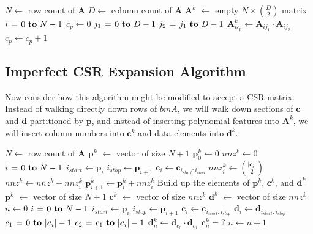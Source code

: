 \documentclass{article} %
\begin{document}
\begin{codebox}
\footnotesize
{}
    \li $N \gets$ row count of $\bm{A}$
    \li $D \gets$ column count of $\bm{A}$
    \li $\bm{A}^k$ $\gets$ empty $N \times \binom{D}{2}$ matrix
    \li \For $i \gets 0 \To N-1$ \Do
    \li     $c_p \gets 0$
    \li     \For $j_1 \gets 0 \To D-1$ \Do
    \li         \For $j_2 \gets j_1 \To D-1$ \Do
    \li             $\bm{A}^k_{i{c_p}} \gets \bm{A}_{ij_1} \cdot \bm{A}_{ij_2}$
    \li             $c_p \gets c_p + 1$
                \End
            \End
       	\End
\end{codebox}

\subsection{Imperfect CSR Expansion Algorithm}
\label{sec:final-algo}
Now consider how this algorithm might be modified to accept a CSR matrix.
Instead of walking directly down rows of $bm{A}$, we will walk down sections of $\bm{c}$ and $\bm{d}$ partitioned by $\bm{p}$, and instead of inserting polynomial features into $\bm{A}^k$, we will insert column numbers into $\bm{c}^k$ and data elements into $\bm{d}^k$.

\begin{codebox}
\footnotesize
{}
    \li $N \gets$ row count of $\bm{A}$
    \li $\bm{p}^k$ $\gets$ vector of size $N+1$
    \li $\bm{p}^k_0 \gets 0$
    \li $nnz^k \gets 0$
    \li \For $i \gets 0 \To N-1$ \Do
    \li     $i_{start} \gets \bm{p}_i$
    \li     $i_{stop} \gets \bm{p}_{i+1}$
    \li     $\bm{c}_i \gets \bm{c}_{i_{start}:i_{stop}}$
    \li     $nnz^k_i \gets \binom{|\bm{c}_i|}{2}$ \label{li:row_nnz_count}
    \li     $nnz^k \gets nnz^k + nnz^k_i$
    \li     $\bm{p}^k_{i+1} \gets \bm{p}^k_i + nnz^k_i$
        \End
    \zi     
    \zi \Comment Build up the elements of $\bm{p}^k$, $\bm{c}^k$, and $\bm{d}^k$
    \li $\bm{p}^k$ $\gets$ vector of size $N+1$
    \li $\bm{c}^k$ $\gets$ vector of size $nnz^k$
    \li $\bm{d}^k$ $\gets$ vector of size $nnz^k$
    \li $n \gets 0$
    \li \For $i \gets 0 \To N-1$ \Do
    \li     $i_{start} \gets \bm{p}_i$
    \li     $i_{stop} \gets \bm{p}_{i+1}$
    \li     $\bm{c}_i \gets \bm{c}_{i_{start}:i_{stop}}$
    \li     $\bm{d}_i \gets \bm{d}_{i_{start}:i_{stop}}$
    \li     \For $c_1 \gets 0 \To |\bm{c}_i|-1$ \Do
    \li         \For $c_2 \gets c_1 \To |\bm{c}_i|-1$ \Do
    \li             $\bm{d}^k_{n} \gets \bm{d}_{c_0} \cdot \bm{d}_{c_1}$
    \li             $\bm{c}^k_{n} = ?$ \label{li:set_ck}
    \li             $n \gets n + 1$
                \End
            \End
       	\End
\end{codebox}
\end{document}

